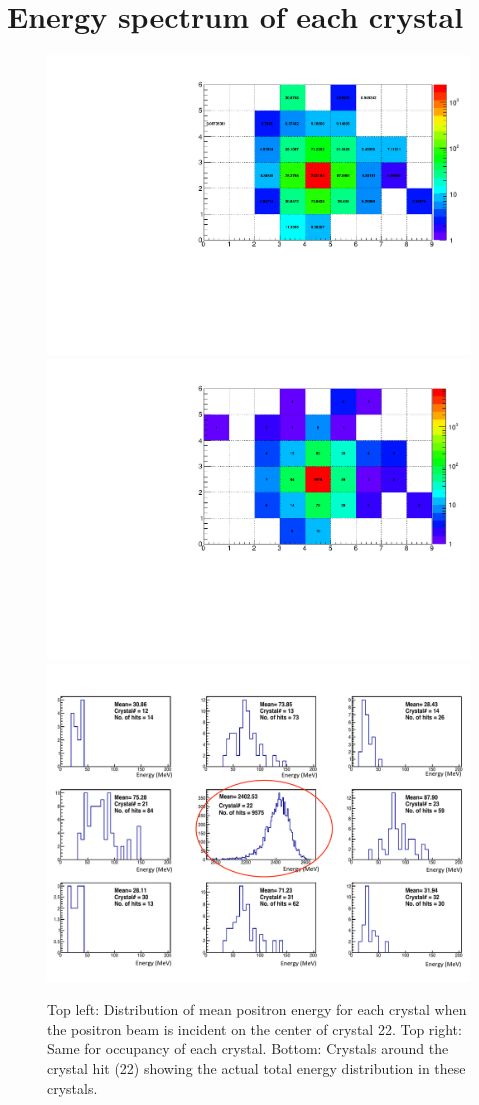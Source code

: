 \documentclass[article,accept,moreauthors,pdftex,10pt,a4paper]{../MDPI_template/Definitions/mdpi}
\begin{document}
\section{Energy spectrum of each crystal}
\begin{figure}[H]
\centering
\includegraphics[width=7.5 cm]{energy_crystal_2d.pdf}
\includegraphics[width=7.5 cm]{no_crystal_2d.pdf}
\includegraphics[width=15 cm]{crystal_energy.pdf}
\caption{\label{fig5} Top left: Distribution of mean positron energy for each crystal when the positron 
beam is incident on the center of crystal 22. Top right: Same for occupancy of each crystal.
Bottom: Crystals around the crystal hit (22) showing the actual total energy distribution in these crystals.}
\end{figure}  
\end{document}
